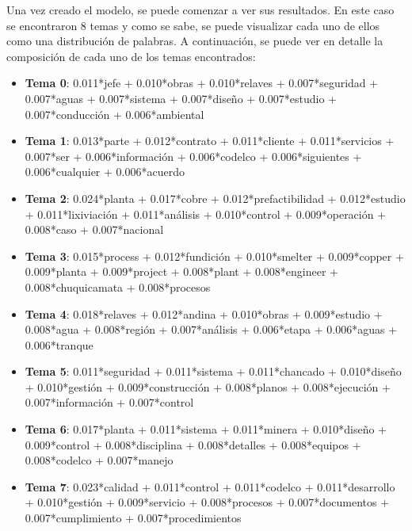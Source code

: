     Una vez creado el modelo, se puede comenzar a ver sus resultados. En este caso se encontraron 8 temas y como se sabe, se puede visualizar cada uno de ellos como una distribución de palabras. A continuación, se puede ver en detalle la composición de cada uno de los temas encontrados: 
    
    \begin{itemize}
        \item \textbf{Tema 0}: 0.011*jefe + 0.010*obras + 0.010*relaves + 0.007*seguridad + 0.007*aguas + 0.007*sistema + 0.007*diseño + 0.007*estudio + 0.007*conducción + 0.006*ambiental
        
        \item \textbf{Tema 1}: 0.013*parte + 0.012*contrato + 0.011*cliente + 0.011*servicios + 0.007*ser + 0.006*información + 0.006*codelco + 0.006*siguientes + 0.006*cualquier + 0.006*acuerdo
        
        \item \textbf{Tema 2}: 0.024*planta + 0.017*cobre + 0.012*prefactibilidad + 0.012*estudio + 0.011*lixiviación + 0.011*análisis + 0.010*control + 0.009*operación + 0.008*caso + 0.007*nacional

        \item \textbf{Tema 3}: 0.015*process + 0.012*fundición + 0.010*smelter + 0.009*copper + 0.009*planta + 0.009*project + 0.008*plant + 0.008*engineer + 0.008*chuquicamata + 0.008*procesos

        \item \textbf{Tema 4}: 0.018*relaves + 0.012*andina + 0.010*obras + 0.009*estudio + 0.008*agua + 0.008*región + 0.007*análisis + 0.006*etapa + 0.006*aguas + 0.006*tranque
        
        \item \textbf{Tema 5}: 0.011*seguridad + 0.011*sistema + 0.011*chancado + 0.010*diseño + 0.010*gestión + 0.009*construcción + 0.008*planos + 0.008*ejecución + 0.007*información + 0.007*control
        
        \item \textbf{Tema 6}: 0.017*planta + 0.011*sistema + 0.011*minera + 0.010*diseño + 0.009*control + 0.008*disciplina + 0.008*detalles + 0.008*equipos + 0.008*codelco + 0.007*manejo
        
        \item \textbf{Tema 7}: 0.023*calidad + 0.011*control + 0.011*codelco + 0.011*desarrollo + 0.010*gestión + 0.009*servicio + 0.008*procesos + 0.007*documentos + 0.007*cumplimiento + 0.007*procedimientos
    \end{itemize}
    
